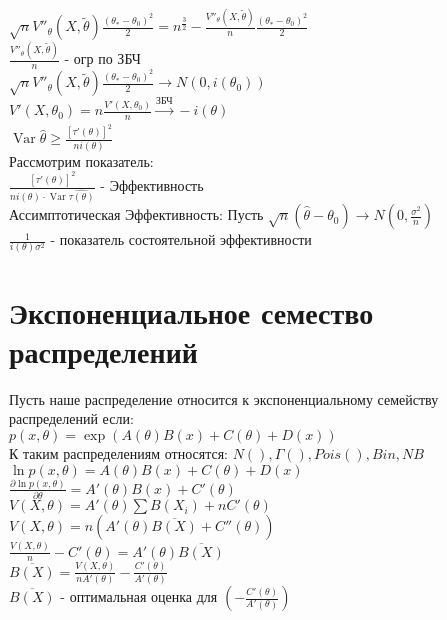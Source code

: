 \documentclass{article}
\newcommand\0{\mathbb{0}}
\DeclareMathOperator{\Var}{Var}
\newcommand\1{\mathbb{1}}
\newcommand{\xrto}{\xrightarrow}
\newcommand{\pat}{\partial}
\begin{document}
$\sqrt{n}V''_\theta(X, \tilde{\theta})\frac{(\theta_* - \theta_0)^2}{2} = n^{\frac{3}{2}} - \frac{V''_\theta(X, \tilde{\theta})}{n}\frac{(\theta_* - \theta_0)^2}{2}$\\
$\frac{V''_\theta(X, \tilde{\theta})}{n}$ - огр по ЗБЧ\\
$\sqrt{n}V''_\theta(X, \tilde{\theta})\frac{(\theta_* - \theta_0)^2}{2} \to N(0, i(\theta_0))$\\
$V'(X, \theta_0) = n \frac{V'(X, \theta_0)}{n} \xrto[]{\text{ЗБЧ}} -i(\theta)$\\
$\Var \widehat{\theta} \geq \frac{[\tau'(\theta)]^2}{ni(\theta)}$\\
Рассмотрим показатель:\\
$\frac{[\tau'(\theta)]^2}{ni(\theta) \cdot \Var \widehat{\tau(\theta)}}$ - Эффективность\\
Ассимптотическая Эффективность: Пусть $\sqrt{n}(\widehat{\theta} - \theta_0) \to N(0, \frac{\sigma^2}{n})$\\
$\frac{1}{i(\theta)\sigma^2}$ - показатель состоятельной эффективности\\
\section{Экспоненциальное семество распределений}
Пусть наше распределение относится к экспоненциальному семейству распределений если:\\
$p(x, \theta) = \exp(A(\theta)B(x) + C(\theta) + D(x))$\\
К таким распределениям относятся: $N(), \Gamma(), Pois(), Bin, NB$\\
$\ln{p(x, \theta)} = A(\theta)B(x) + C(\theta) + D(x)$\\
$\frac{\pat \ln{p(x, \theta)}}{\pat \theta} = A'(\theta)B(x) + C'(\theta)$\\
$V(X, \theta) = A'(\theta)\displaystyle\sum B(X_i) + nC'(\theta)$\\
$V(X, \theta) = n(A'(\theta)\overline{B(X)} + C''(\theta))$\\
$\frac{V(X, \theta)}{n} - C'(\theta) = A'(\theta)\overline{B(X)}$\\
$\overline{B(X)} = \frac{V(X, \theta)}{nA'(\theta)} - \frac{C'(\theta)}{A'(\theta)}$\\
$\overline{B(X)}$ - оптимальная оценка для $(-\frac{C'(\theta)}{A'(\theta)})$\\
\end{document}
